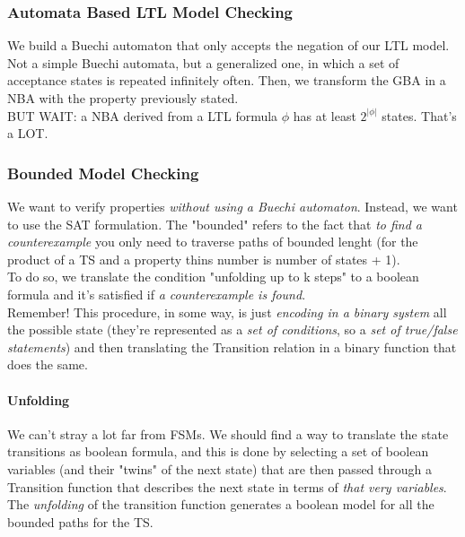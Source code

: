 \documentclass{article}
\begin{document}
				\subsubsection{Automata Based LTL Model Checking}
					We build a Buechi automaton that only accepts the negation of our LTL model. Not a simple Buechi automata, but a generalized one, in which a set of acceptance states is repeated infinitely often. Then, we transform the GBA in a NBA with the property previously stated.\\
					BUT WAIT: a NBA derived from a LTL formula $\phi$ has at least $2^{\vert \phi \vert}$ states. That's a LOT.
					
				\subsubsection{Bounded Model Checking}
					We want to verify properties \emph{without using a Buechi automaton}. Instead, we want to use the SAT formulation. The "bounded" refers to the fact that \emph{to find a counterexample} you only need to traverse paths of bounded lenght (for the product of a TS and a property thins number is number of states + 1).\\
					To do so, we translate the condition "unfolding up to k steps" to a boolean formula and it's satisfied if \emph{a counterexample is found}.\\
					Remember! This procedure, in some way, is just \emph{encoding in a binary system} all the possible state (they're represented as a \emph{set of conditions}, so a \emph{set of true/false statements}) and then translating the Transition relation in a binary function that does the same.
					
					\paragraph{Unfolding}
						We can't stray a lot far from FSMs. We should find a way to translate the state transitions as boolean formula, and this is done by selecting a set of boolean variables (and their "twins" of the next state) that are then passed through a Transition function that describes the next state in terms of \emph{that very variables}. The \emph{unfolding} of the transition function generates a boolean model for all the bounded paths for the TS.
						
\end{document}
